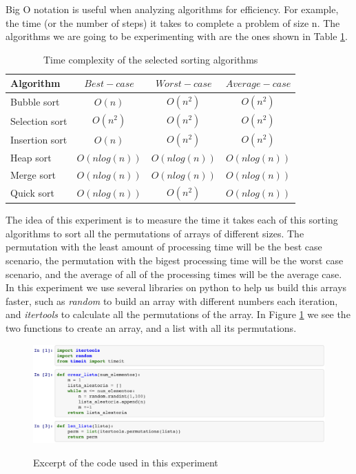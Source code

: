 \documentclass{article}
\begin{document}
Big O notation is useful when analyzing algorithms for efficiency. For example, the time (or the number of steps) it takes to complete a problem of size n. The algorithms we are going to be experimenting with are the ones shown in Table \ref{ta1}.

\begin{table}[h!]
\centering
 \caption{Time complexity of the selected sorting algorithms} 
 \label{ta1}
 \begin{tabular} {| l | c | c | c |}
 \hline
Algorithm	&	$	Best-case	$	&	$	Worst-case	$	&	$	Average-case	$	\\
\hline
Bubble sort	&	$	O(n)	$	&	$	O(n^2)	$	&	$	O(n^2)	$	\\
\hline
Selection sort	&	$	O(n^2)	$	&	$	O(n^2)	$	&	$	O(n^2)	$	\\
\hline
Insertion sort	&	$	O(n)	$	&	$	O(n^2)	$	&	$	O(n^2)	$	\\
\hline
Heap sort	&	$	O(n log(n))	$	&	$	O(n log(n))	$	&	$	O(n log(n))	$	\\
\hline
Merge sort	&	$	O(n log(n))	$	&	$	O(n log(n))	$	&	$	O(n log(n))	$	\\
\hline
Quick sort	&	$	O(n log(n))	$	&	$	O(n^2)	$	&	$	O(n log(n))	$	\\
\hline
 \end{tabular}
 \end{table}
 
The idea of this experiment is to measure the time it takes each of this sorting algorithms to sort all the permutations of arrays of different sizes. The permutation with the least amount of processing time will be the best case scenario, the permutation with the bigest processing time will be the worst case scenario, and the average of all of the processing times will be the average case. \\

In this experiment we use several libraries on python to help us build this arrays faster, such as \textit{random} to build an array with different numbers each iteration, and \textit{itertools} to calculate all the permutations of the array. In Figure \ref{librerias} we see the two functions to create an array, and a list with all its permutations.\\

 

\begin{figure}[htp]
	\centering
	\caption{Excerpt of the code used in this experiment}
	\includegraphics[width=\linewidth]{librerias.png}
	\label{librerias}

\end{figure}
\end{document}
